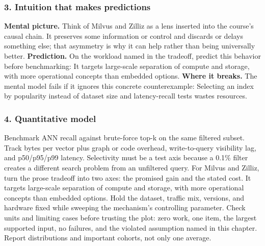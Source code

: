 \subsubsection*{3. Intuition that makes predictions}
\textbf{Mental picture.} Think of Milvus and Zilliz as a lens inserted into the course's causal chain. It preserves some information or control and discards or delays something else; that asymmetry is why it can help rather than being universally better.
\textbf{Prediction.} On the workload named in the tradeoff, predict this behavior before benchmarking: It targets large-scale separation of compute and storage, with more operational concepts than embedded options.
\textbf{Where it breaks.} The mental model fails if it ignores this concrete counterexample: Selecting an index by popularity instead of dataset size and latency-recall tests wastes resources.
\subsubsection*{4. Quantitative model}
Benchmark ANN recall against brute-force top-k on the same filtered subset. Track bytes per vector plus graph or code overhead, write-to-query visibility lag, and p50/p95/p99 latency. Selectivity must be a test axis because a 0.1\% filter creates a different search problem from an unfiltered query.
For Milvus and Zilliz, turn the prose tradeoff into two axes: the promised gain and the stated cost. It targets large-scale separation of compute and storage, with more operational concepts than embedded options. Hold the dataset, traffic mix, versions, and hardware fixed while sweeping the mechanism's controlling parameter.
Check units and limiting cases before trusting the plot: zero work, one item, the largest supported input, no failures, and the violated assumption named in this chapter. Report distributions and important cohorts, not only one average.
